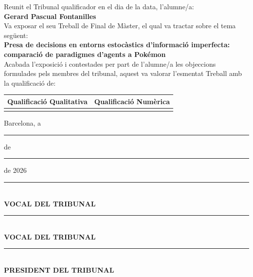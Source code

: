 \noindent
Reunit el Tribunal qualificador en el dia de la data, l'alumne/a:\\[1.5ex]
\textbf{Gerard Pascual Fontanilles}\\[2.5ex]
Va exposar el seu Treball de Final de Màster, el qual va tractar sobre el tema següent:\\[1.5ex]
\textbf{Presa de decisions en entorns estocàstics d'informació imperfecta: comparació de paradigmes d'agents a Pokémon}\\[2.5ex]
Acabada l'exposició i contestades per part de l'alumne/a les objeccions formulades pels membres del tribunal, aquest va valorar l'esmentat Treball amb la qualificació de:\\[3ex]

\begin{center}
    \setlength{\tabcolsep}{24pt}
    \renewcommand{\arraystretch}{2.2}
    \begin{tabular}{|c|c|}
        \hline
        \textbf{Qualificació Qualitativa} & \textbf{Qualificació Numèrica} \\
        \hline
        \rule{0pt}{35pt} & \\
        \hline
    \end{tabular}
\end{center}

\vspace{1.8cm}
\noindent
Barcelona, a \rule{1.2cm}{0.4pt} de \rule{3.5cm}{0.4pt} de 2026\\[3.0cm]

\noindent
\begin{minipage}[t]{0.45\textwidth}
    \centering
    \rule{5.5cm}{0.4pt}\\[0.5ex]
    \textbf{VOCAL DEL TRIBUNAL}
\end{minipage}\hfill
\begin{minipage}[t]{0.45\textwidth}
    \centering
    \rule{5.5cm}{0.4pt}\\[0.5ex]
    \textbf{VOCAL DEL TRIBUNAL}
\end{minipage}

\vspace{2.5cm}
\begin{center}
    \rule{6cm}{0.4pt}\\[0.5ex]
    \textbf{PRESIDENT DEL TRIBUNAL}
\end{center}

\clearpage
